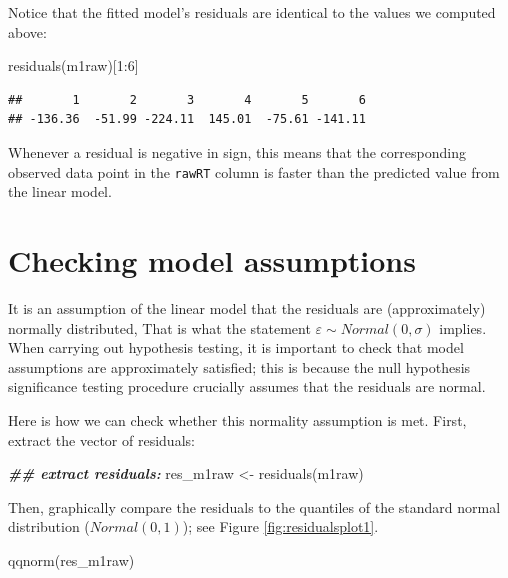 \documentclass[
  12pt,
]{krantz}
\newenvironment{Shaded}{\begin{snugshade}}{\end{snugshade}}
\newcommand{\DecValTok}[1]{\textcolor[rgb]{0.00,0.00,0.81}{#1}}
\newcommand{\DocumentationTok}[1]{\textcolor[rgb]{0.56,0.35,0.01}{\textbf{\textit{#1}}}}
\newcommand{\FunctionTok}[1]{\textcolor[rgb]{0.00,0.00,0.00}{#1}}
\newcommand{\NormalTok}[1]{#1}
\newcommand{\OtherTok}[1]{\textcolor[rgb]{0.56,0.35,0.01}{#1}}
\newcommand{\SpecialCharTok}[1]{\textcolor[rgb]{0.00,0.00,0.00}{#1}}
\theoremstyle{definition}
\theoremstyle{definition}
\theoremstyle{definition}
\theoremstyle{definition}
\theoremstyle{remark}
\begin{document}
Notice that the fitted model's residuals are identical to the values we computed above:

\begin{Shaded}
\begin{Highlighting}[]
\FunctionTok{residuals}\NormalTok{(m1raw)[}\DecValTok{1}\SpecialCharTok{:}\DecValTok{6}\NormalTok{]}
\end{Highlighting}
\end{Shaded}

\begin{verbatim}
##       1       2       3       4       5       6 
## -136.36  -51.99 -224.11  145.01  -75.61 -141.11
\end{verbatim}

Whenever a residual is negative in sign, this means that the corresponding observed data point in the \texttt{rawRT} column is faster than the predicted value from the linear model.

\hypertarget{checking-model-assumptions}{%
\section{Checking model assumptions}\label{checking-model-assumptions}}

It is an assumption of the linear model that the residuals are (approximately) normally distributed, That is what the statement \(\varepsilon\sim Normal(0,\sigma)\) implies. When carrying out hypothesis testing, it is important to check that model assumptions are approximately satisfied; this is because the null hypothesis significance testing procedure crucially assumes that the residuals are normal.

Here is how we can check whether this normality assumption is met. First, extract the vector of residuals:

\begin{Shaded}
\begin{Highlighting}[]
\DocumentationTok{\#\# extract residuals:}
\NormalTok{res\_m1raw }\OtherTok{\textless{}{-}} \FunctionTok{residuals}\NormalTok{(m1raw)}
\end{Highlighting}
\end{Shaded}

Then, graphically compare the residuals to the quantiles of the standard normal distribution (\(Normal(0,1)\)); see Figure \ref{fig:residualsplot1}.

\begin{Shaded}
\begin{Highlighting}[]
\FunctionTok{qqnorm}\NormalTok{(res\_m1raw)}
\end{Highlighting}
\end{Shaded}
\end{document}
